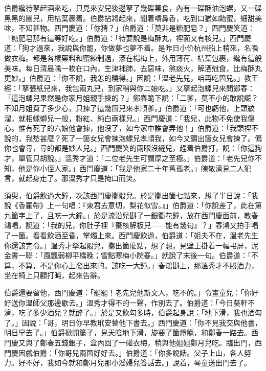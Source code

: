 伯爵纔待拏起酒來吃，只見來安兒後邊拏了幾碟菓食，內有一碟酥油泡螺，又一碟黑黑的團兒，用桔葉裹着。伯爵拈將起來，聞着噴鼻香，吃到口猶如飴蜜，細甜美味，不知甚物。西門慶道：「你猜？」伯爵道：「莫非是糖肥皂？」西門慶笑道：「糖肥皂那有這等好吃。」伯爵道：「待要說是梅酥丸，裡面又有核兒。」西門慶道：「狗才過來，我說與你罷，你做夢也夢不着。是昨日小价杭州船上稍來，名喚做衣梅。都是各樣藥料和蜜練制過，滾在楊梅上，外用薄荷、桔葉包裹，纔有這般美味。每日清晨噙一枚在口內，生津補肺，去惡味，煞痰火，解酒尅食，比梅酥丸更妙。」伯爵道：「你不說，我怎的曉得。」因說：「溫老先兒，咱再吃箇兒。」教王經：「拏張紙兒來，我包兩丸兒，到家稍與你二娘吃。」又拏起泡螺兒來問鄭春：「這泡螺兒果然是你家月姐親手揀的？」鄭春跪下說：「二爹，莫不小的敢說謊？不知月姐費了多少心，只揀了這幾箇兒來孝順爹。」伯爵道：「可也虧他，上頭紋溜，就相螺螄兒一般，粉紅、純白兩樣兒。」西門慶道：「我兒，此物不免使我傷心。惟有死了的六娘他會揀，他沒了，如今家中誰會弄他！」伯爵道：「我頭裡不說的，我愁甚麼？死了一箇女兒會揀泡螺兒孝順我，如今又鑽出箇女兒會揀了。偏你也會尋，尋的都是妙人兒。」{}西門慶笑的兩眼沒縫兒，趕着伯爵打，說：「你這狗才，單管只胡說。」溫秀才道：「二位老先生可謂厚之至極。」{}伯爵道：「老先兒你不知，他是你小侄人家。」西門慶道：「我是他家二十年舊孤老。」陳敬濟見二人犯言，就起身走了。那溫秀才只是掩口而笑。{}

須臾，伯爵飲過大鐘，次該西門慶擲骰兒。於是擲出箇七點來，想了半日說：「我說《香羅帶》上一句唱：『東君去意切，梨花似雪。』」伯爵道：「你說差了，此在第九箇字上了，且吃一大鐘。」於是流沿兒斟了一銀衢花鐘，放在西門慶面前，教春鴻唱，說道：「我的兒，你肚子裡『棗核解板兒——能有幾句』？」春鴻又拍手唱了一箇。看看飲酒至昏，掌燭上來。西門慶飲過，伯爵道：「姐夫不在，溫老先生你還該完令。」溫秀才拏起骰兒，擲出箇麼點，想了想，見壁上掛着一幅弔屏，泥金書一聯：「風飄弱柳平橋晚；雪點寒梅小院春。」就說了末後一句。伯爵道：「不算，不算，不是你心上發出來的。該吃一大鐘。」春鴻斟上，那溫秀才不勝酒力，坐在椅上只顧打盹，起來告辭。

伯爵還要留他，西門慶道：「罷罷！老先兒他斯文人，吃不的。」令畫童兒：「你好好送你溫師父那邊歇去。」溫秀才得不的一聲，作別去了。伯爵道：「今日葵軒不濟，吃了多少酒兒？就醉了。」於是又飲勾多時，伯爵起身說：「地下滑，我也酒勾了。」因說：「哥，明日你早教玳安替他下書去。」西門慶道：「你不見我交與他書，明日早去了。」伯爵掀開簾子，見天陰地下滑，旋要了箇燈籠，和鄭春一路去。西門慶又與了鄭春五錢銀子，盒內回了一礶衣梅，稍與他姐姐鄭月兒吃。臨出門，西門慶因戲伯爵：「你哥兒兩箇好好去。」{}伯爵道：「你多說話。父子上山，各人努力。好不好，我如今就和鄭月兒那小淫婦兒答話去。」說着，琴童送出門去了。

